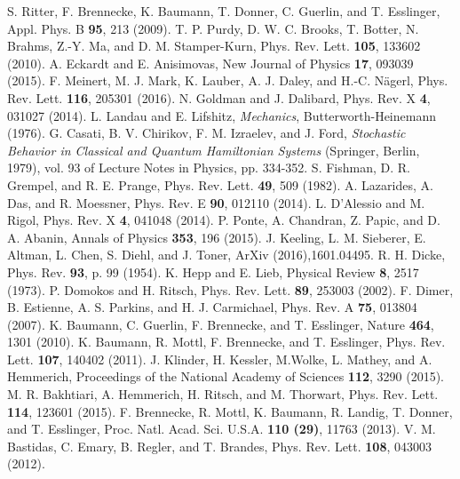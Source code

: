 \documentclass[aps,prl,twocolumn,superscriptaddress,groupedaddress]{revtex4}  %
\begin{document}
{{\begin{thebibliography}{99}
 S. Ritter, F. Brennecke, K. Baumann, T. Donner, C. Guerlin, and T. Esslinger, Appl. Phys. B \textbf{95}, 213 (2009).
 T. P. Purdy, D. W. C. Brooks, T. Botter, N. Brahms, Z.-Y. Ma, and D. M. Stamper-Kurn, Phys. Rev. Lett. \textbf{105}, 133602 (2010).
 A. Eckardt and E. Anisimovas, New Journal of Physics \textbf{17}, 093039 (2015).
 F. Meinert, M. J. Mark, K. Lauber, A. J. Daley, and H.-C. N\"{a}gerl, Phys. Rev. Lett. \textbf{116}, 205301 (2016).
 N. Goldman and J. Dalibard, Phys. Rev. X \textbf{4}, 031027 (2014).
 L. Landau and E. Lifshitz, \textit{Mechanics}, Butterworth-Heinemann (1976).
 G. Casati, B. V. Chirikov, F. M. Izraelev, and J. Ford,
\textit{Stochastic Behavior in Classical and Quantum Hamiltonian Systems} (Springer, Berlin, 1979), vol. 93 of Lecture Notes in Physics, pp. 334-352.
 S. Fishman, D. R. Grempel, and R. E. Prange, Phys. Rev. Lett. \textbf{49}, 509 (1982).
 A. Lazarides, A. Das, and R. Moessner, Phys. Rev. E \textbf{90}, 012110 (2014).
 L. D'Alessio and M. Rigol, Phys. Rev. X \textbf{4}, 041048 (2014).
 P. Ponte, A. Chandran, Z. Papic, and D. A. Abanin, Annals of Physics \textbf{353}, 196 (2015).
 J. Keeling, L. M. Sieberer, E. Altman, L. Chen, S. Diehl, and J. Toner, ArXiv (2016),1601.04495.
 R. H. Dicke, Phys. Rev. \textbf{93}, p. 99 (1954).
 K. Hepp and E. Lieb, Physical Review \textbf{8}, 2517 (1973).
 P. Domokos and H. Ritsch, Phys. Rev. Lett. \textbf{89}, 253003 (2002).
 F. Dimer, B. Estienne, A. S. Parkins, and H. J. Carmichael, Phys. Rev. A \textbf{75}, 013804 (2007).
 K. Baumann, C. Guerlin, F. Brennecke, and T. Esslinger, Nature \textbf{464}, 1301 (2010).
  K. Baumann, R. Mottl, F. Brennecke, and T. Esslinger, Phys. Rev. Lett. \textbf{107}, 140402 (2011).
 J. Klinder, H. Kessler, M.Wolke, L. Mathey, and A. Hemmerich, Proceedings of the National Academy of Sciences \textbf{112}, 3290 (2015).
  M. R. Bakhtiari, A. Hemmerich, H. Ritsch, and M. Thorwart, Phys. Rev. Lett. \textbf{114}, 123601 (2015).
 F. Brennecke, R. Mottl, K. Baumann, R. Landig, T. Donner, and T. Esslinger, Proc. Natl. Acad. Sci. U.S.A. \textbf{110 (29)}, 11763 (2013).
 V. M. Bastidas, C. Emary, B. Regler, and T. Brandes, Phys. Rev. Lett. \textbf{108}, 043003 (2012).

\end{thebibliography}}}
\end{document}
